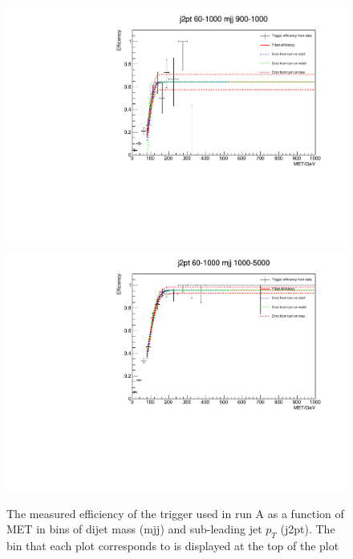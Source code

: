 \begin{figure}[h!]
\begin{center}
    \includegraphics[width=.6\largefigwidth]{plots/parked/trigfitplots/hData_MET_1D_44A.pdf}
    \includegraphics[width=.6\largefigwidth]{plots/parked/trigfitplots/hData_MET_1D_45A.pdf}
    \caption{The measured efficiency of the trigger used in run A as a function of MET in bins of dijet mass (mjj) and sub-leading jet $p_{T}$ (j2pt). The bin that each plot corresponds to is displayed at the top of the plot}
    \label{fig:trigfitplotsA2}
  \end{center}
\end{figure}

